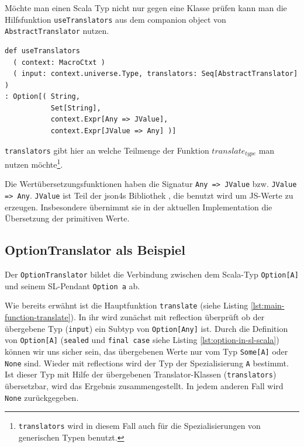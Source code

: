 \documentclass[12pt,bibtotoc]{scrreprt}
\begin{document}
Möchte man einen Scala Typ nicht nur gegen eine Klasse prüfen kann man die Hilfsfunktion \lstinline!useTranslators! aus dem companion object von \lstinline!AbstractTranslator! nutzen.

\begin{lstlisting}[caption=Statische Hilfsfunktion in AbstractTranslator, label=lst:hilfsfunktionen]
def useTranslators
  ( context: MacroCtxt )
  ( input: context.universe.Type, translators: Seq[AbstractTranslator] )
: Option[( String,
           Set[String], 
           context.Expr[Any => JValue], 
           context.Expr[JValue => Any] )]
\end{lstlisting}

\lstinline!translators! gibt hier an welche Teilmenge der Funktion $translate_{type}$ man nutzen möchte\footnote{\lstinline!translators! wird in diesem Fall auch für die Spezialisierungen von generischen Typen benutzt.}. 

Die Wertübersetzungsfunktionen haben die Signatur \lstinline!Any => JValue! bzw. \lstinline!JValue => Any!. \lstinline!JValue! ist Teil der json4s Bibliothek \cite{Json4s}, die benutzt wird um JS-Werte zu erzeugen. Insbesondere übernimmt sie in der aktuellen Implementation die Übersetzung der primitiven Werte.

\subsection{OptionTranslator als Beispiel}
\label{subsec:example-option-translator}

Der \lstinline!OptionTranslator! bildet die Verbindung zwischen dem Scala-Typ \lstinline!Option[A]! und seinem SL-Pendant \lstinline!Option a! ab. 

Wie bereits erwähnt ist die Hauptfunktion \lstinline!translate! (siehe Listing \ref{lst:main-function-translate}). In ihr wird zunächst mit reflection überprüft ob der übergebene Typ (\lstinline!input!) ein Subtyp von \lstinline!Option[Any]! ist. Durch die Definition von \lstinline!Option[A]! (\lstinline!sealed! und \lstinline!final case! siehe Listing \ref{lst:option-in-sl-scala}) können wir uns sicher sein, das übergebenen Werte nur vom Typ \lstinline!Some[A]! oder \lstinline!None! sind. Wieder mit reflections wird der Typ der Spezialisierung \lstinline!A! bestimmt. Ist dieser Typ mit Hilfe der übergebenen Translator-Klassen (\lstinline!translators!) übersetzbar, wird das Ergebnis zusammengestellt. In jedem anderen Fall wird \lstinline!None! zurückgegeben.
\end{document}
